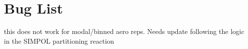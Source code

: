 \chapter{Bug List}
\hypertarget{bug}{}\label{bug}

\begin{DoxyRefList}
\item[Member \doxylink{rxn___h_l__phase__transfer_8c_aa82a07e921e3d22fda1d52073b16219d}{rxn\+\_\+\+HL\+\_\+phase\+\_\+transfer\+\_\+calc\+\_\+deriv\+\_\+contrib} (\doxylink{struct_model_data}{Model\+Data} \texorpdfstring{$\ast$}{*}model\+\_\+data, \doxylink{struct_time_derivative}{Time\+Derivative} time\+\_\+deriv, int \texorpdfstring{$\ast$}{*}rxn\+\_\+int\+\_\+data, double \texorpdfstring{$\ast$}{*}rxn\+\_\+float\+\_\+data, double \texorpdfstring{$\ast$}{*}rxn\+\_\+env\+\_\+data, realtype time\+\_\+step)]\label{bug__bug000001}%
%
this does not work for modal/binned aero reps. Needs update following the logic in the SIMPOL partitioning reaction
\end{DoxyRefList}